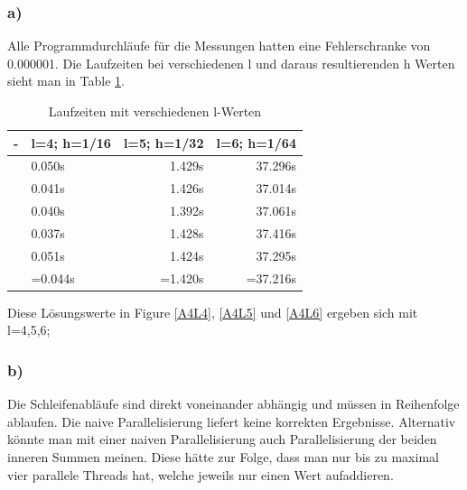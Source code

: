 \documentclass{report}
\begin{document}
	\subsubsection{a)}
Alle Programmdurchläufe für die Messungen hatten eine Fehlerschranke von 0.000001. Die Laufzeiten bei verschiedenen l und daraus resultierenden h Werten sieht man in Table \ref{Table:4a}.
\begin{table}
\begin{tabular}{|l|l|r|r|}
		\hline
		- & l=4; h=1/16 & l=5; h=1/32 & l=6; h=1/64\\
		\hline
		& 0.050s & 1.429s & 37.296s \\
		& 0.041s & 1.426s & 37.014s  \\
		& 0.040s & 1.392s & 37.061s \\
		& 0.037s & 1.428s & 37.416s  \\
		& 0.051s & 1.424s & 37.295s  \\
		& =0.044s & =1.420s & =37.216s  \\
		\hline

	\end{tabular}
	\caption{Laufzeiten mit verschiedenen l-Werten}
	\label{Table:4a}
\end{table}
	\newline Diese Lösungswerte in Figure \ref{A4L4}, \ref{A4L5} und \ref{A4L6} ergeben sich mit l=4,5,6;  \newline
	
	\subsubsection{b)}
	Die Schleifenabläufe sind direkt voneinander abhängig und müssen in Reihenfolge ablaufen. Die naive Parallelisierung liefert keine korrekten Ergebnisse. Alternativ könnte man mit einer naiven Parallelisierung auch Parallelisierung der beiden inneren Summen meinen. Diese hätte zur Folge, dass man nur bis zu maximal vier parallele Threads hat, welche jeweils nur einen Wert aufaddieren.
\end{document}
